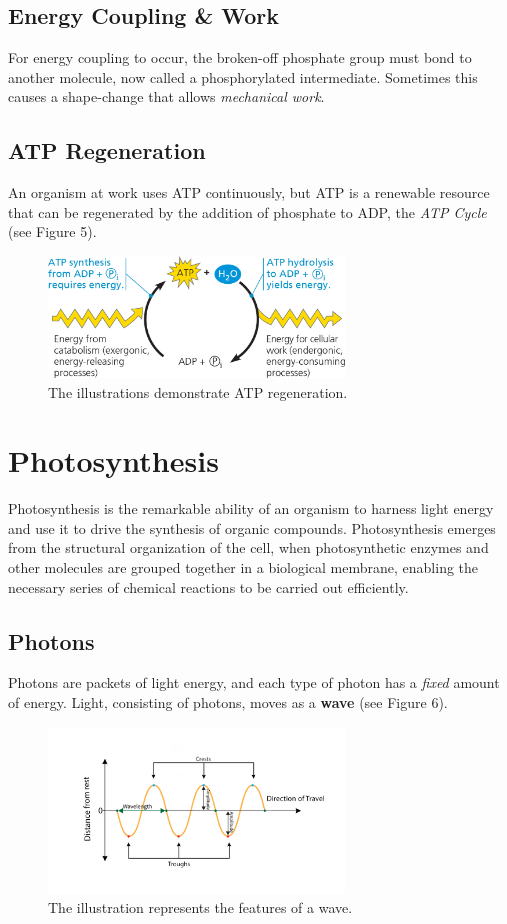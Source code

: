 \documentclass[a4paper]{article}
\begin{document}
\subsection{Energy Coupling \& Work}
For energy coupling to occur, the broken-off phosphate group must bond to another molecule, now called a \color{red}phosphorylated intermediate\color{black}. Sometimes this causes a shape-change that allows \textit{mechanical work}.

\subsection{ATP Regeneration}
An organism at work uses ATP continuously, but ATP is a renewable resource that can be regenerated by the addition of phosphate to ADP, the \textit{ATP Cycle} (see Figure 5).

\begin{figure}[h!]
\centering
\includegraphics[width=0.7\textwidth]{figure_five.jpeg}
\caption{The illustrations demonstrate ATP regeneration.}
\end{figure}

\section{Photosynthesis}
\color{red}Photosynthesis \color{black} is the remarkable ability of an organism to harness light energy and use it to drive the synthesis of organic compounds. Photosynthesis emerges from the structural organization of the cell, when photosynthetic enzymes and other molecules are grouped together in a biological membrane, enabling the necessary series of chemical reactions to be carried out efficiently.

\subsection{Photons}
Photons are packets of light energy, and each type of photon has a \textit{fixed} amount of energy. Light, consisting of photons, moves as a \textbf{wave} (see Figure 6).

\begin{figure}[h!]
\centering
\includegraphics[width=0.7\textwidth]{figure_six.png}
\caption{The illustration represents the features of a wave.}
\end{figure}
\end{document}
